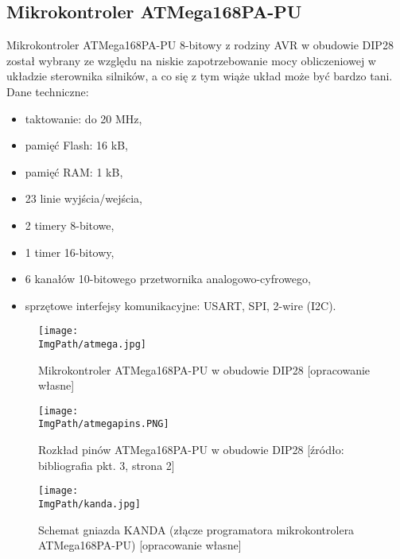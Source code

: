 \documentclass[a4paper,12pt,twoside,openany]{report}
\newcommand{\ImgPath}{.}
\begin{document}
\newpage

\subsection{Mikrokontroler ATMega168PA-PU}

Mikrokontroler ATMega168PA-PU 8-bitowy z rodziny AVR w obudowie DIP28 został wybrany ze względu na niskie zapotrzebowanie mocy obliczeniowej w układzie sterownika silników, a co się z tym wiąże układ może być bardzo tani.\\
Dane techniczne:
\begin{itemize}
\item taktowanie: do 20 MHz,
\item pamięć Flash: 16 kB,
\item pamięć RAM: 1 kB,
\item 23 linie wyjścia/wejścia,
\item 2 timery 8-bitowe,
\item 1 timer 16-bitowy,
\item 6 kanałów 10-bitowego przetwornika analogowo-cyfrowego,
\item sprzętowe interfejsy komunikacyjne: USART, SPI, 2-wire (I2C).
\end{itemize}

\begin{figure}[!htbp]
	\begin{center}
\centering
\texttt{[image: \\ImgPath/atmega.jpg]}
\end{center}
	\caption{Mikrokontroler ATMega168PA-PU w obudowie DIP28 [opracowanie własne]}
	\label{schematKomunikacji}
\end{figure}

\begin{figure}[!htbp]
	\begin{center}
\centering
\texttt{[image: \\ImgPath/atmegapins.PNG]}
\end{center}
	\caption{Rozkład pinów ATMega168PA-PU w obudowie DIP28 [źródło: bibliografia pkt. 3, strona 2]}
	\label{schematKomunikacji}
\end{figure}

\begin{figure}[!htbp]
	\begin{center}
\centering
\texttt{[image: \\ImgPath/kanda.jpg]}
\end{center}
	\caption{Schemat gniazda KANDA (złącze programatora mikrokontrolera ATMega168PA-PU) [opracowanie własne]}
	\label{schematKomunikacji}
\end{figure}
\end{document}
